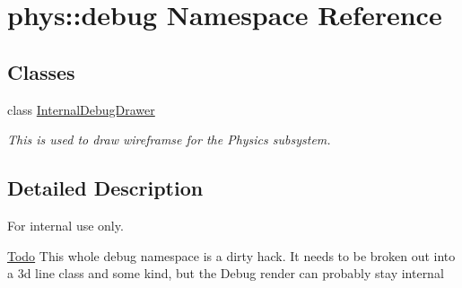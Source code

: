 \hypertarget{namespacephys_1_1debug}{
\section{phys::debug Namespace Reference}
\label{d0/d53/namespacephys_1_1debug}
}
\subsection*{Classes}
\begin{DoxyCompactItemize}
\item 
class \hyperlink{classphys_1_1debug_1_1InternalDebugDrawer}{InternalDebugDrawer}
\begin{DoxyCompactList}\small\item\em This is used to draw wireframse for the Physics subsystem. \item\end{DoxyCompactList}\end{DoxyCompactItemize}


\subsection{Detailed Description}
\begin{DoxyInternal}{For internal use only.}
\begin{Desc}
\item[\hyperlink{todo__todo000013}{Todo}]This whole debug namespace is a dirty hack. It needs to be broken out into a 3d line class and some kind, but the Debug render can probably stay internal \end{Desc}
\end{DoxyInternal}
